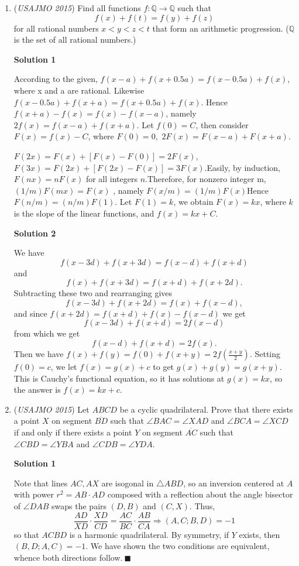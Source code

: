 \begin{enumerate}
 


	\item (\textit{USAJMO 2015}) Find all functions $f:\mathbb{Q}\rightarrow\mathbb{Q}$ such that
 \[f(x)+f(t)=f(y)+f(z)\]for all rational numbers $x<y<z<t$ that form an arithmetic progression. ($\mathbb{Q}$ is the set of all rational numbers.)


 



\textbf{Solution 1}

According to the given, $f(x-a)+f(x+0.5a)=f(x-0.5a)+f(x)$, where x and a are rational. Likewise $f(x-0.5a)+f(x+a)=f(x+0.5a)+f(x)$. Hence $f(x+a)-f(x)= f(x)-f(x-a)$, namely $2f(x)=f(x-a)+f(x+a)$. Let $f(0)=C$, then consider $F(x)=f(x)-C$, where $F(0)=0,$ $2F(x)=F(x-a)+F(x+a)$. 

 $F(2x)=F(x)+[F(x)-F(0)]=2F(x)$, $F(3x)=F(2x)+[F(2x)-F(x)]=3F(x)$.Easily, by induction, $F(nx)=nF(x)$ for all integers $n$.Therefore, for nonzero integer m, $(1/m)F(mx)=F(x)$ , namely $F(x/m)=(1/m)F(x)$Hence $F(n/m)=(n/m)F(1)$. Let $F(1)=k$, we obtain $F(x)=kx$, where $k$ is the slope of the linear functions, and $f(x)=kx+C$.

 



\textbf{Solution 2}

We have 
 \[f(x-3d)+f(x+3d)=f(x-d)+f(x+d)\] and 
 \[f(x)+f(x+3d)=f(x+d)+f(x+2d).\] Subtracting these two and rearranging gives 
 \[f(x-3d)+f(x+2d)=f(x)+f(x-d),\] and since $f(x+2d)=f(x+d)+f(x)-f(x-d)$ we get 
 \[f(x-3d)+f(x+d)=2f(x-d)\] from which we get 
 \[f(x-d)+f(x+d)=2f(x).\] Then we have $f(x)+f(y)=f(0)+f(x+y)=2f\left(\frac{x+y}{2}\right)$. Setting $f(0)=c$, we let $f(x)=g(x)+c$ to get $g(x)+g(y)=g(x+y)$. This is Cauchy's functional equation, so it has solutions at $g(x)=kx$, so the answer is $\boxed{f(x)=kx+c}$.

 


	\item (\textit{USAJMO 2015}) Let $ABCD$ be a cyclic quadrilateral. Prove that there exists a point $X$ on segment $\overline{BD}$ such that $\angle BAC=\angle XAD$ and $\angle BCA=\angle XCD$ if and only if there exists a point $Y$ on segment $\overline{AC}$ such that $\angle CBD=\angle YBA$ and $\angle CDB=\angle YDA$.


 



\textbf{Solution 1}

Note that lines $AC, AX$ are isogonal in $\triangle ABD$, so an inversion centered at $A$ with power $r^2=AB\cdot AD$ composed with a reflection about the angle bisector of $\angle DAB$ swaps the pairs $(D,B)$ and $(C,X)$. Thus, 
 \[\frac{AD}{XD}\cdot \frac{XD}{CD}=\frac{AC}{BC}\cdot \frac{AB}{CA}\Longrightarrow (A,C;B,D)=-1\]so that $ACBD$ is a harmonic quadrilateral. By symmetry, if $Y$ exists, then $(B,D;A,C)=-1$. We have shown the two conditions are equivalent, whence both directions follow$.\:\blacksquare\:$





\end{enumerate}
